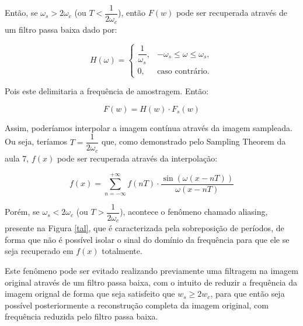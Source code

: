 \documentclass[]{abntex2}
\begin{document}
Então, se $\omega_s > 2\omega_c$ (ou $T < \dfrac{1}{2\omega_c}$), então $F(w)$ pode ser recuperada através de um filtro passa baixa dado por:

\begin{equation}
	H(\omega) =
	\begin{cases}
		\dfrac{1}{\omega_s}, & -\omega_s \leq \omega \leq \omega_s, \\
		0, & \text{caso contrário.}
	\end{cases}
\end{equation}

Pois este delimitaria a frequência de amostragem. Então:

\begin{equation*}
	F(w) = H(w) \cdot F_s(w)
\end{equation*}

Assim, poderíamos interpolar a imagem contínua através da imagem sampleada. Ou seja, teríamos $T=\dfrac{1}{2\omega_c}$ que, como demonstrado pelo Sampling Theorem da aula 7, $f(x)$ pode ser recuperada através da interpolação:

\begin{equation*}
	f(x) = \sum_{n=-\infty}^{+\infty} f(nT) \cdot \dfrac{\sin(\omega(x-nT))}{\omega(x-nT)}
\end{equation*}

Porém, se $\omega_s < 2\omega_c$ (ou $T>\dfrac{1}{2\omega_c}$), acontece o fenômeno chamado aliasing, presente na Figura \ref{tal}, que é caracterizada pela sobreposição de períodos, de forma que não é possível isolar o sinal do domínio da frequência para que ele se seja recuperado em $f(x)$ totalmente.


Este fenômeno pode ser evitado realizando previamente uma filtragem na imagem original através de um filtro passa baixa, com o intuito de reduzir a frequência da imagem orignal de forma que seja satisfeito que $w_s \geq  2w_c$, para que então seja possível posteriormente a reconstrução completa da imagem original, com frequência reduzida pelo filtro passa baixa.

\end{document}
